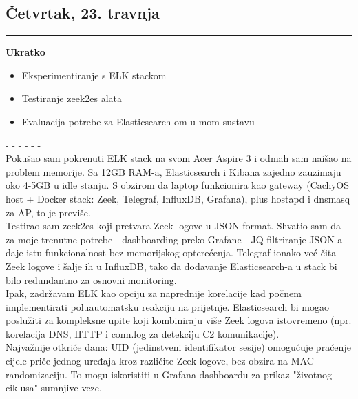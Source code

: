 \documentclass[12pt, a4paper]{article}
\newcommand{\dan}[1]{
    \subsection*{#1}
    \vspace{-0.5em} 
    \hrule \vspace{0.5em} 
}
\begin{document}
\dan{Četvrtak, 23. travnja}
\textbf{Ukratko}
\begin{itemize}
    \item Eksperimentiranje s ELK stackom
    \item Testiranje zeek2es alata
    \item Evaluacija potrebe za Elasticsearch-om u mom sustavu
\end{itemize}
- - - - - - \\
Pokušao sam pokrenuti ELK stack na svom Acer Aspire 3 i odmah sam naišao na problem memorije. Sa 12GB RAM-a, Elasticsearch i 
Kibana zajedno zauzimaju oko 4-5GB u idle stanju. S obzirom da laptop funkcionira kao gateway (CachyOS host + Docker stack: 
Zeek, Telegraf, InfluxDB, Grafana), plus hostapd i dnsmasq za AP, to je previše.
\\
Testirao sam zeek2es koji pretvara Zeek logove u JSON format. Shvatio sam da za moje trenutne potrebe - dashboarding preko 
Grafane - JQ filtriranje JSON-a daje istu funkcionalnost bez memorijskog opterećenja. Telegraf ionako već čita Zeek logove i 
šalje ih u InfluxDB, tako da dodavanje Elasticsearch-a u stack bi bilo redundantno za osnovni monitoring.
\\
Ipak, zadržavam ELK kao opciju za naprednije korelacije kad počnem implementirati poluautomatsku reakciju na prijetnje. 
Elasticsearch bi mogao poslužiti za kompleksne upite koji kombiniraju više Zeek logova istovremeno (npr. korelacija DNS, HTTP i 
conn.log za detekciju C2 komunikacije).
\\
Najvažnije otkriće dana: UID (jedinstveni identifikator sesije) omogućuje praćenje cijele priče jednog uređaja kroz različite 
Zeek logove, bez obzira na MAC randomizaciju. To mogu iskoristiti u Grafana dashboardu za prikaz "životnog ciklusa" sumnjive veze.
\end{document}

